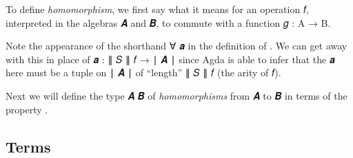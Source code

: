 \documentclass[a4paper,UKenglish,cleveref,autoref,thm-restate]{lipics-v2021}
\begin{document}
To define \emph{homomorphism}, we first say what it means for an operation \ab 𝑓, interpreted in the algebras \ab 𝑨 and \ab 𝑩, to commute with a function \ab 𝑔 \as : \ab A \as → \ab B.
\ccpad
\begin{code}

\end{code}
\ccpad
Note the appearance of the shorthand \as ∀ \ab 𝒂 in the definition of . We can get away with this in place of \ab 𝒂 \as : \af ∥ \ab 𝑆 \af ∥ \ab 𝑓 \as → \af ∣ \ab 𝑨 \af ∣ since Agda is able to infer that the \ab 𝒂 here must be a tuple on \af ∣ \ab 𝑨 \af ∣ of ``length'' \af ∥ \ab 𝑆 \af ∥ \ab 𝑓 (the arity of \ab 𝑓).

Next we will define the type  \ab 𝑨 \ab 𝑩 of \emph{homomorphisms} from \ab 𝑨 to \ab 𝑩 in terms of the property .
\ccpad
\begin{code}%

\end{code}
\ccpad















\subsection{Terms}\label{ssec:terms}
\end{document}
